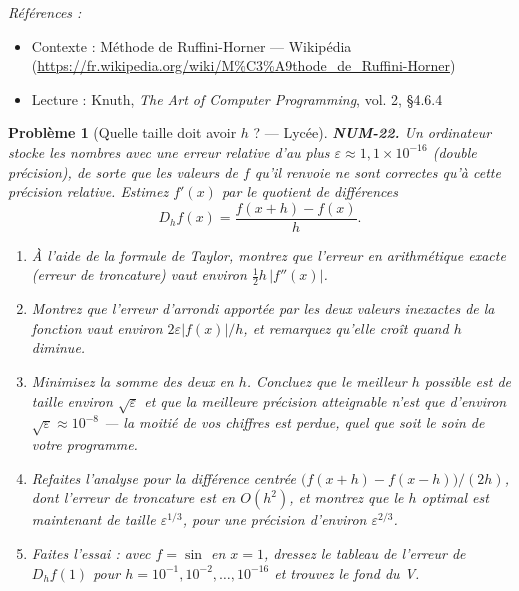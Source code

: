 \documentclass[11pt]{article}
\newtheorem{problem}{Problème}
\newenvironment{refs}{\par\small\noindent\emph{Références :}\begin{itemize}\setlength\itemsep{0pt}}{\end{itemize}\normalsize}
\begin{document}
\begin{refs}
\item Contexte : Méthode de Ruffini-Horner --- Wikipédia (\url{https://fr.wikipedia.org/wiki/M%C3%A9thode_de_Ruffini-Horner})
\item Lecture : Knuth, \textit{The Art of Computer Programming}, vol. 2, \S{}4.6.4
\end{refs}

\bigskip

\begin{problem}[{Quelle taille doit avoir $h$ ? --- Lycée}]
\textbf{NUM-22.} Un ordinateur stocke les nombres avec une erreur relative d'au plus $\varepsilon \approx 1{,}1 \times 10^{-16}$ (double précision), de sorte que les valeurs de $f$ qu'il renvoie ne sont correctes qu'à cette précision relative. Estimez $f'(x)$ par le quotient de différences
\[ D_h f(x) = \frac{f(x+h) - f(x)}{h}. \]
\begin{enumerate}
\item[(a)] À l'aide de la formule de Taylor, montrez que l'erreur en arithmétique exacte (erreur de troncature) vaut environ $\tfrac{1}{2} h\,|f''(x)|$.
\item[(b)] Montrez que l'erreur d'arrondi apportée par les deux valeurs inexactes de la fonction vaut environ $2\varepsilon |f(x)| / h$, et remarquez qu'elle \textit{croît} quand $h$ diminue.
\item[(c)] Minimisez la somme des deux en $h$. Concluez que le meilleur $h$ possible est de taille environ $\sqrt{\varepsilon}$ et que la meilleure précision atteignable n'est que d'environ $\sqrt{\varepsilon} \approx 10^{-8}$ --- la moitié de vos chiffres est perdue, quel que soit le soin de votre programme.
\item[(d)] Refaites l'analyse pour la différence centrée $\big(f(x+h) - f(x-h)\big)/(2h)$, dont l'erreur de troncature est en $O(h^2)$, et montrez que le $h$ optimal est maintenant de taille $\varepsilon^{1/3}$, pour une précision d'environ $\varepsilon^{2/3}$.
\item[(e)] Faites l'essai : avec $f = \sin$ en $x = 1$, dressez le tableau de l'erreur de $D_h f(1)$ pour $h = 10^{-1}, 10^{-2}, \dots, 10^{-16}$ et trouvez le fond du V.
\end{enumerate}

\end{problem}
\end{document}
